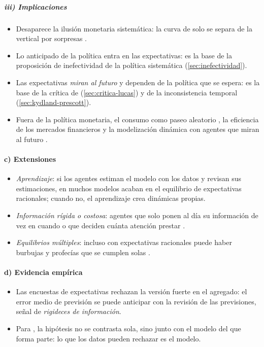 \documentclass[11pt]{article}
\begin{document}
\subparagraph{iii) Implicaciones}

\begin{itemize}
\item Desaparece la ilusión monetaria sistemática: la curva de  solo se separa de la vertical por sorpresas .
\item Lo anticipado de la política entra en las expectativas: es la base de la proposición de inefectividad de la política sistemática (\ref{sec:inefectividad}).
\item Las expectativas \emph{miran al futuro} y dependen de la política que se espera: es la base de la crítica de  (\ref{sec:critica-lucas}) y de la inconsistencia temporal (\ref{sec:kydland-prescott}).
\item Fuera de la política monetaria, el consumo como paseo aleatorio\nocite{Hall1978} , la eficiencia de los mercados financieros\nocite{Fama1970Efficient} y la modelización dinámica con agentes que miran al futuro .
\end{itemize}

\paragraph{c) Extensiones}

\begin{itemize}
\item \emph{Aprendizaje}: si los agentes estiman el modelo con los datos y revisan sus estimaciones, en muchos modelos acaban en el equilibrio de expectativas racionales; cuando no, el aprendizaje crea dinámicas propias\nocite{EvansHonkapohja2001Learning,Sargent1993Bounded}.
\item \emph{Información rígida o costosa}: agentes que solo ponen al día su información de vez en cuando\nocite{MankiwReis2002Sticky} o que deciden cuánta atención prestar\nocite{Sims2003Implications} .
\item \emph{Equilibrios múltiples}: incluso con expectativas racionales puede haber burbujas y profecías que se cumplen solas .
\end{itemize}

\paragraph{d) Evidencia empírica}

\begin{itemize}
\item Las encuestas de expectativas rechazan la versión fuerte en el agregado: el error medio de previsión se puede anticipar con la revisión de las previsiones, señal de \emph{rigideces de información}\nocite{CoibionGorodnichenko2015Information}.
\item Para , la hipótesis no se contrasta sola, sino junto con el modelo del que forma parte: lo que los datos pueden rechazar es el modelo.
\end{itemize}
\end{document}
